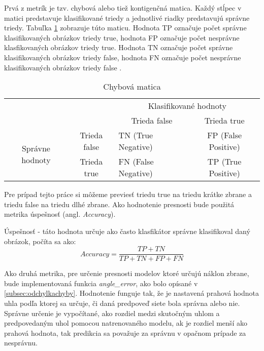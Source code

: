 Prvá z metrík je tzv. chybová alebo tiež kontigenčná matica.
Každý stĺpec v matici predstavuje klasifikované triedy a jednotlivé riadky predstavujú správne triedy.
Tabuľka \ref{tab:chybovamatica} zobrazuje túto maticu.
Hodnota TP označuje počet správne klasifikovaných obrázkov triedy true, hodnota FP označuje počet nesprávne klasfikovaných obrázkov triedy true.
Hodnota TN označuje počet správne klasifikovaných obrázkov triedy false, hodnota FN označuje počet nesprávne klasifikovaných obrázkov triedy false \cite{odkaz:ChybovaMatica}.
\begin{table}[H]
    \centering
    \label{tab:chybovamatica}
        \begin{tabular}{lllc}
                                                                &                                   & \multicolumn{2}{c}{Klasifikované hodnoty}                                           \\ \cline{3-4} 
                                                                & \multicolumn{1}{l|}{}             & \multicolumn{1}{c|}{Trieda false}        & \multicolumn{1}{c|}{Trieda true}         \\ \cline{2-4} 
        \multicolumn{1}{c|}{\multirow{2}{*}{Správne hodnoty}} & \multicolumn{1}{c|}{Trieda false} & \multicolumn{1}{l|}{TN (True Negative)}  & \multicolumn{1}{c|}{FP (False Positive)} \\ \cline{2-4} 
        \multicolumn{1}{c|}{}                                 & \multicolumn{1}{c|}{Trieda true}  & \multicolumn{1}{l|}{FN (False Negative)} & \multicolumn{1}{c|}{TP (True Positive)}  \\ \cline{2-4} 
    \end{tabular}
    \caption{Chybová matica}
\end{table}
Pre prípad tejto práce si môžeme previesť triedu true na triedu krátke zbrane a triedu false na triedu dlhé zbrane.
Ako hodnotenie presnosti bude použitá metrika úspešnosť (angl. \textit{Accuracy}).

Úspešnosť - táto hodnota určuje ako často klasfikátor správne klasifikoval daný obrázok, počíta sa ako:
\begin{equation}
    Accuracy = \frac{TP + TN}{TP + TN + FP + FN}
\end{equation}

Ako druhá metrika, pre určenie presnosti modelov ktoré určujú náklon zbrane, bude implementovaná funkcia \textit{angle\_error}, ako bolo opísané v \ref{subsec:odchylkachyby}.
Hodnotenie funguje tak, že je nastavená prahová hodnota uhla podľa ktorej sa určuje, či daná predpoveď siete bola správna alebo nie.
Správne určenie je vypočítané, ako rozdiel medzi skutočným uhlom a predpovedaným uhol pomocou natrenovaného modelu, ak je rozdiel menší ako prahová hodnota, tak predikcia
    sa považuje za správnu v opačnom prípade za nesprávnu.
